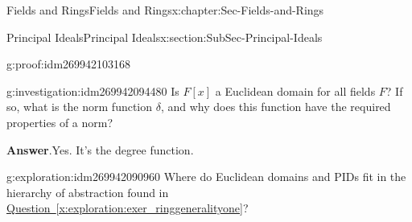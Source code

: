 \documentclass[oneside,10pt,]{book}
\numberwithin{equation}{section}
\begin{document}
\begin{chapterptx}{Fields and Rings}{}{Fields and Rings}{}{}{x:chapter:Sec-Fields-and-Rings}
\begin{sectionptx}{Principal Ideals}{}{Principal Ideals}{}{}{x:section:SubSec-Principal-Ideals}
\begin{proofptx}{}{g:proof:idm269942103168}
\end{proofptx}
\begin{investigation}{}{g:investigation:idm269942094480}%
Is \(F[x]\) a Euclidean domain for all fields \(F\)? If so, what is the norm function \(\delta\), and why does this function have the required properties of a norm?%
\par\smallskip%
\noindent\textbf{Answer}.\hypertarget{g:answer:idm269942091984}{}\quad{}Yes. It's the degree function.%
\end{investigation}
\begin{exploration}{}{g:exploration:idm269942090960}%
Where do Euclidean domains and PIDs fit in the hierarchy of abstraction found in \hyperref[x:exploration:exer_ringgeneralityone]{Question~\ref{x:exploration:exer_ringgeneralityone}}?%
\end{exploration}
\end{sectionptx}
\end{chapterptx}
%
%
\typeout{************************************************}
\typeout{************************************************}
%
\end{document}
